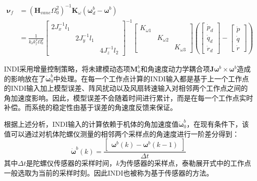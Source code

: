 \begin{equation}
    \begin{aligned}
        \boldsymbol{\nu}_f&=(\boldsymbol{H}_{vane}\Omega_0^2)^{-1}\boldsymbol{K}_{\omega}(\boldsymbol{\omega}_d^b-\boldsymbol{\omega}^b)\\
        &=\frac{1}{k_{\delta}k_f^2\Omega_0^2}
        \left[\begin{array}{ccc}2J_x^{-1}l_1 & & \\& 2J_y^{-1}l_1 & \\& & 4J_z^{-1}l_2\end{array}\right]^{-1}
        \left[\begin{array}{ccc}{K}_{\omega 1} & & \\& {K}_{\omega 2} & \\& & {K}_{\omega 3}\end{array}\right]
        \left (\begin{bmatrix}\dot{p}_d \\ \dot{q}_d \\ \dot{r}_d \end{bmatrix}-\begin{bmatrix}\dot{p} \\ \dot{q} \\ \dot{r}
        \end{bmatrix}\right )
    \end{aligned}
    \label{3-48}
\end{equation}

INDI采用增量控制策略，将未建模动态项$\boldsymbol{M}_{a}^b$和角速度动力学耦合项$\boldsymbol{J}\boldsymbol{\omega}^b\times\boldsymbol{\omega}^b$造成的影响放在了$\dot {\boldsymbol{\omega}}_0^b$中处理。在每一个工作点计算的INDI输入都是基于上一个工作点的INDI输入加上模型误差、阵风扰动以及风扇转速输入对相邻两个工作点之间的角加速度影响。因此，模型误差不会随着时间进行累计，而是在每一个工作点实时补偿。而系统的稳定性由基于误差的角速度反馈来保证。

根据上述分析，INDI输入的计算依赖于机体的角加速度值$\dot {\boldsymbol{\omega}}_0^b$，在现有条件下，该值可以通过对机体陀螺仪测量的相邻两个采样点的角速度进行一阶差分得到：
\begin{equation}
    \dot{\boldsymbol{\omega}}^b(k)=\frac{
        \begin{bmatrix}
        \boldsymbol{\omega}^b(k)-\boldsymbol{\omega}^b(k-1)
        \end{bmatrix}}{\Delta t}
    \label{3-49}
\end{equation}
其中$\Delta t$是陀螺仪传感器的采样时间，$k$为传感器的采样点，泰勒展开式中的工作点一般选取为当前的采样时刻。因此INDI也被称为基于传感器的方法。

